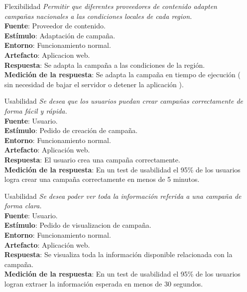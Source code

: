 \documentclass[a4paper, 11pt]{article}
\begin{document}
\begin{itemize}
\item[Flexibilidad] \textit{Permitir que diferentes proveedores de contenido adapten campa\~nas nacionales a las condiciones locales de cada region.} \\
\textbf{Fuente}:  Proveedor de contenido.  \\
\textbf{Estímulo}: Adaptación de campa\~na. \\
\textbf{Entorno}: Funcionamiento normal. \\
\textbf{Artefacto}: Aplicacion web. \\
\textbf{Respuesta}: Se adapta la campa\~na a las condiciones de la región. \\
\textbf{Medición de la respuesta}: Se adapta la campa\~na en tiempo de ejecución ( sin necesidad de bajar el servidor o detener la aplicación ). \\

\item[Usabilidad] \textit{Se desea que los usuarios puedan crear campa\~nas correctamente de forma fácil y rápida.} \\
\textbf{Fuente}:  Usuario. \\
\textbf{Estímulo}: Pedido de creación de campa\~na. \\
\textbf{Entorno}: Funcionamiento normal. \\
\textbf{Artefacto}: Aplicación web. \\
\textbf{Respuesta}: El usuario crea una campa\~na correctamente. \\
\textbf{Medición de la respuesta}: En un test de usabilidad el 95\% de los usuarios logra crear una campa\~na correctamente en menos de 5 minutos. \\

\item[Usabilidad] \textit{Se desea poder ver toda la información referida a una campa\~na de forma clara.} \\
\textbf{Fuente}:  Usuario. \\
\textbf{Estímulo}: Pedido de visualizacion de campa\~na. \\
\textbf{Entorno}: Funcionamiento normal. \\
\textbf{Artefacto}: Aplicación web. \\
\textbf{Respuesta}: Se visualiza toda la información disponible relacionada con la campa\~na. \\
\textbf{Medición de la respuesta}: En un test de usabilidad el 95\% de los usuarios logran extraer la información esperada en menos de 30 segundos. \\


\end{itemize}
\end{document}
